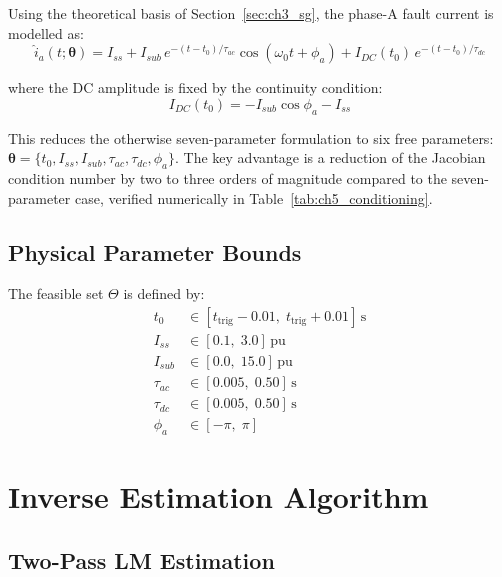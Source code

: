 Using the theoretical basis of Section~\ref{sec:ch3_sg}, the phase-A
fault current is modelled as:
\begin{equation}
  \hat{i}_a(t; \bm{\theta}) = I_{ss}
    + I_{sub}\,e^{-(t-t_0)/\tau_{ac}}\cos(\omega_0 t + \phi_a)
    + I_{DC}(t_0)\,e^{-(t-t_0)/\tau_{dc}}
  \label{eq:ch5_model}
\end{equation}

where the DC amplitude is fixed by the continuity condition:
\begin{equation}
  I_{DC}(t_0) = -I_{sub}\cos\phi_a - I_{ss}
  \label{eq:ch5_dc_continuity}
\end{equation}

This reduces the otherwise seven-parameter formulation to six free parameters:
$\bm{\theta} = \{t_0, I_{ss}, I_{sub}, \tau_{ac}, \tau_{dc}, \phi_a\}$.
The key advantage is a reduction of the Jacobian condition number by
two to three orders of magnitude compared to the seven-parameter case,
verified numerically in Table~\ref{tab:ch5_conditioning}.

\subsection{Physical Parameter Bounds}

The feasible set $\Theta$ is defined by:
\begin{align}
  t_0 &\in [t_\mathrm{trig} - 0.01,\; t_\mathrm{trig} + 0.01]\,\text{s}
  \label{eq:ch5_t0_bounds} \\
  I_{ss} &\in [0.1,\; 3.0]\,\text{pu}
  \label{eq:ch5_iss_bounds} \\
  I_{sub} &\in [0.0,\; 15.0]\,\text{pu}
  \label{eq:ch5_isub_bounds} \\
  \tau_{ac} &\in [0.005,\; 0.50]\,\text{s}
  \label{eq:ch5_tauac_bounds} \\
  \tau_{dc} &\in [0.005,\; 0.50]\,\text{s}
  \label{eq:ch5_taudc_bounds} \\
  \phi_a &\in [-\pi,\; \pi]
  \label{eq:ch5_phi_bounds}
\end{align}

\section{Inverse Estimation Algorithm}
\label{sec:ch5_estimation}

\subsection{Two-Pass LM Estimation}

